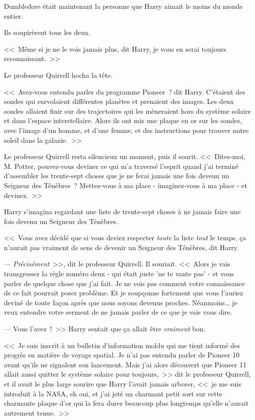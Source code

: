 Dumbledore était maintenant la personne que Harry aimait le moins du monde entier.

Ils soupirèrent tous les deux.

<<~Même si je ne le vois jamais plus, dit Harry, je vous en serai toujours reconnaissant.~>>

Le professeur Quirrell hocha la tête.

<<~Avez-vous entendu parler du programme Pioneer~? dit Harry. C'étaient des sondes qui survolaient différentes planètes et prenaient des images. Les deux sondes allaient finir sur des trajectoires qui les mèneraient hors du système solaire et dans l'espace interstellaire. Alors ils ont mis une plaque en or sur les sondes, avec l'image d'un homme, et d'une femme, et des instructions pour trouver notre soleil dans la galaxie.~>>

Le professeur Quirrell resta silencieux un moment, puis il sourit. <<~Dites-moi, M. Potter, pouvez-vous deviner ce qui m'a traversé l'esprit quand j'ai terminé d'assembler les trente-sept choses que je ne ferai jamais une fois devenu un Seigneur des Ténèbres~? Mettez-vous à ma place - imaginez-vous à ma place - et devinez.~>>

Harry s'imagina regardant une liste de trente-sept choses à ne jamais faire une fois devenu un Seigneur des Ténèbres.

<<~Vous avez décidé que si vous deviez respecter \emph{toute} la liste \emph{tout} le temps, ça n'aurait pas vraiment de sens de devenir un Seigneur des Ténèbres, dit Harry.

--- \emph{Précisément}~>>, dit le professeur Quirrell. Il souriait. <<~Alors je vais transgresser la règle numéro deux - qui était juste 'ne te vante pas' - et vous parler de quelque chose que j'ai fait. Je ne vois pas comment votre connaissance de ce fait pourrait poser problème. Et je soupçonne fortement que vous l'auriez deviné de toute façon après que nous soyons devenus proches. Néanmoins… je veux entendre votre serment de ne jamais parler de ce que je vais vous dire.

--- Vous l'avez~!~>> Harry sentait que ça allait être \emph{vraiment} bon.

<<~Je suis inscrit à un bulletin d'information moldu qui me tient informé des progrès en matière de voyage spatial. Je n'ai pas entendu parler de Pioneer 10 avant qu'ils ne signalent son lancement. Mais j'ai alors découvert que Pioneer 11 allait aussi quitter le système solaire pour toujours,~>> dit le professeur Quirrell, et il avait le plus large sourire que Harry l'avait jamais arborer, <<~je me suis introduit à la NASA, eh oui, et j'ai jeté un charmant petit sort sur cette charmante plaque d'or qui la fera durer beaucoup plus longtemps qu'elle n'aurait autrement tenue.~>>

